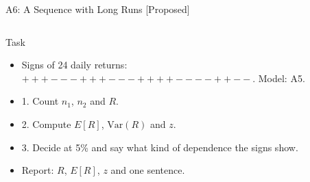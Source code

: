 \begin{frame}{A6: A Sequence with Long Runs [Proposed]}
\propsub
\itemsize{\scriptsize}
\begin{columns}[T]
\begin{column}{\taskw}
\begin{block}{Task}
\begin{itemize}
    \item Signs of 24 daily returns: $+ + + - - - + + + - - - + + + + - - - - + + - -$. Model: A5.
    \item 1. Count $n_1$, $n_2$ and $R$.
    \item 2. Compute $E[R]$, $\mathrm{Var}(R)$ and $z$.
    \item 3. Decide at 5\% and say what kind of dependence the signs show.
    \item Report: $R$, $E[R]$, $z$ and one sentence.
\end{itemize}
\end{block}
\end{column}
\begin{column}{\solw}
\end{column}
\end{columns}
\end{frame}

